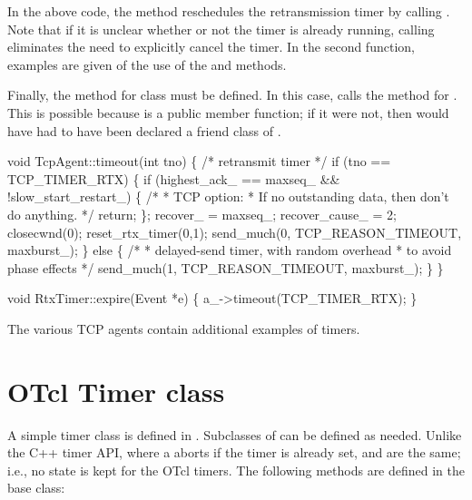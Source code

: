 In the above code, the  method reschedules the 
retransmission timer by calling .  Note that if
it is unclear whether or not the timer is already running, calling
 eliminates the need to explicitly cancel the timer.  In
the second function, examples are given of the use of the 
and  methods.

Finally, the  method for class  must be 
defined.  In this case,  calls the  method
for .  This is possible because  is a 
public member function; if it were not, then  would have
had to have been declared a friend class of .
\begin{program}
void TcpAgent::timeout(int tno)
\{                     
    /* retransmit timer */
    if (tno == TCP_TIMER_RTX) \{
        if (highest_ack_ == maxseq_ && !slow_start_restart_) \{
            /*
             * {\cf TCP option:}
             * {\cf If no outstanding data, then don't do anything.}
             */
            return;  
        \};
        recover_ = maxseq_;
        recover_cause_ = 2;
        closecwnd(0);
        reset_rtx_timer(0,1);
        send_much(0, TCP_REASON_TIMEOUT, maxburst_); 
    \} else \{
        /* 
         * {\cf delayed-send timer, with random overhead}
         * {\cf to avoid phase effects  }
         */     
        send_much(1, TCP_REASON_TIMEOUT, maxburst_);
    \}           
\}           
            
void RtxTimer::expire(Event *e) \{
    a_->timeout(TCP_TIMER_RTX);
\}
\end{program}

The various TCP agents contain additional examples of timers.

\section{OTcl Timer class}
\label{sec:otcltimer}

A simple timer class is defined in .  Subclasses of
 can be defined as needed.  Unlike the C++ timer API, where a 
 aborts if the timer is already set,  and
 are the same; i.e., no state is kept for the OTcl timers.
The following methods are defined in the  base class:

\endinput
